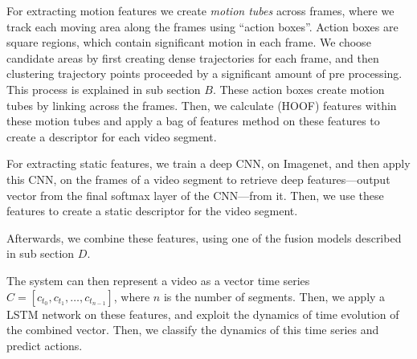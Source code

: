 For extracting motion features we create \textit{motion tubes} across frames, where we track each moving area along the frames using ``action boxes''.
Action boxes are square regions, which contain significant motion in each frame. We choose candidate areas by first creating dense trajectories for each frame,
and then clustering trajectory points proceeded by a significant amount of pre processing. This process is explained in sub section $B$.
These action boxes create motion tubes by linking across the frames. Then, we calculate (HOOF)\cite{chaudhry2009histograms} features within these motion tubes and apply a
bag of features
method on these features to create a descriptor for each video segment.

For extracting static features, we train a deep CNN, on Imagenet, and then apply this CNN,
on the frames of a video segment to retrieve deep features---output vector from the final softmax layer of the CNN---from it. Then, we use these features
to create a static descriptor for the video segment.

Afterwards, we combine these features, using one of the fusion models described in sub section $D$.

The system can then represent a video as a vector time series $C = [c_{t_0}, c_{t_1}, \dots, c_{t_{n-1}}]$,
where $n$ is the number of segments. Then, we apply a LSTM network on these features, and exploit the dynamics of time evolution of the combined vector.
Then, we classify the dynamics of this time series and predict actions.



